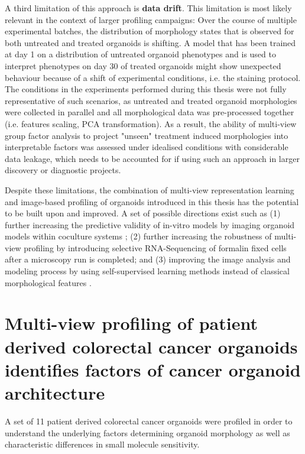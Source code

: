 \begin{flushleft}
A third limitation of this approach is \textbf{data drift}. This limitation is most likely relevant in the context of larger profiling campaigns: Over the course of multiple experimental batches, the distribution of morphology states that is observed for both untreated and treated organoids is shifting. A model that has been trained at day 1 on a distribution of untreated organoid phenotypes and is used to interpret phenotypes on day 30 of treated organoids might show unexpected behaviour because of a shift of experimental conditions, i.e. the staining protocol. The conditions in the experiments performed during this thesis were not fully representative of such scenarios, as untreated and treated organoid morphologies were collected in parallel and all morphological data was pre-processed together (i.e. features scaling, PCA transformation). As a result, the ability of multi-view group factor analysis to project "unseen" treatment induced morphologies into interpretable factors was assessed under idealised conditions with considerable data leakage, which needs to be accounted for if using such an approach in larger discovery or diagnostic projects.
\par
\bigbreak

Despite these limitations, the combination of multi-view representation learning and image-based profiling of organoids introduced in this thesis has the potential to be built upon and improved. A set of possible directions exist such as (1) further increasing the predictive validity of in-vitro models by imaging organoid models within coculture systems \parencite{cattaneoTumorOrganoidCell2020}; (2) further increasing the robustness of multi-view profiling by introducing selective RNA-Sequencing of formalin fixed cells after a microscopy run is completed; and (3) improving the image analysis and modeling process by using self-supervised learning methods instead of classical morphological features \parencite{perakisContrastiveLearningSingleCell2021}.

\clearpage
\section{Multi-view profiling of patient derived colorectal cancer organoids identifies factors of cancer organoid architecture}

A set of 11 patient derived colorectal cancer organoids were profiled in order to understand the underlying factors determining organoid morphology as well as characteristic differences in small molecule sensitivity.


\end{flushleft}
